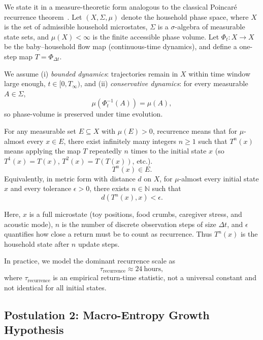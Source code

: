 \documentclass[11pt]{article}
\begin{document}
We state it in a measure-theoretic form analogous to the classical Poincar\'e recurrence theorem~\cite{Poincare1890,BARREIRA}. Let $(X,\Sigma,\mu)$ denote the household phase space, where $X$ is the set of admissible household microstates, $\Sigma$ is a $\sigma$-algebra of measurable state sets, and $\mu(X)<\infty$ is the finite accessible phase volume. Let $\Phi_t:X\to X$ be the baby--household flow map (continuous-time dynamics), and define a one-step map $T=\Phi_{\Delta t}$.

We assume (i) \emph{bounded dynamics}: trajectories remain in $X$ within time window large enough, $t \in [0, T_\infty)$, and (ii) \emph{conservative dynamics}: for every measurable $A\in\Sigma$, 
\begin{equation}
\mu\!\left(\Phi_t^{-1}(A)\right)=\mu(A),
\end{equation}
so phase-volume is preserved under time evolution.

For any measurable set $E\subseteq X$ with $\mu(E)>0$, recurrence means that for $\mu$-almost every $x\in E$, there exist infinitely many integers $n\ge 1$ such that
$T^n(x)$ means applying the map $T$ repeatedly $n$ times to the initial state $x$ (so $T^1(x)=T(x)$, $T^2(x)=T(T(x))$, etc.).
\begin{equation}
T^n(x)\in E.
\end{equation}
Equivalently, in metric form with distance $d$ on $X$, for $\mu$-almost every initial state $x$ and every tolerance $\epsilon>0$, there exists $n\in\mathbb{N}$ such that
\begin{equation}
d\!\left(T^n(x),x\right)<\epsilon.
\end{equation}

Here, $x$ is a full microstate (toy positions, food crumbs, caregiver stress, and acoustic mode), $n$ is the number of discrete observation steps of size $\Delta t$, and $\epsilon$ quantifies how close a return must be to count as recurrence. Thus $T^n(x)$ is the household state after $n$ update steps.

In practice, we model the dominant recurrence scale as
\begin{equation}
\tau_{\text{recurrence}}\approx 24\ \text{hours},
\end{equation}
where $\tau_{\text{recurrence}}$ is an empirical return-time statistic, not a universal constant and not identical for all initial states.

\subsection{Postulation 2: Macro-Entropy Growth Hypothesis}
\end{document}
